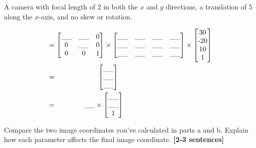 \documentclass{csci1430}
\begin{document}
\pagebreak
\begin{subsubquestion}[points=1]
A camera with focal length of $2$ in both the $x$ and $y$ directions, a translation of $5$ along the $x$-axis, and no skew or rotation.
\end{subsubquestion}

\begin{answer}
\begin{align*}
    &= \begin{bmatrix} 
    \_\_ & \_\_ & $0$    \\  %
    $0$ & \_\_ & $0$     \\  %
    $0$ & $0$ & $1$ 
    \end{bmatrix} 
    \times
    \begin{bmatrix} 
    \_\_ & \_\_ & \_\_ & \_\_  \\ %
    \_\_ & \_\_ & \_\_ & \_\_  \\ %
    \_\_ & \_\_ & \_\_ & \_\_     %
    \end{bmatrix} \times
    \begin{bmatrix} 
    $30$    \\ 
    $-20$   \\ 
    $10$    \\ 
    $1$ \end{bmatrix} \\
    &= \qquad \qquad \qquad \begin{bmatrix} 
    \_\_    \\   %
    \_\_    \\   %
    \_\_         %
    \end{bmatrix} \\
    &= \qquad \quad \quad 
    \_\_         %
    \times 
    \begin{bmatrix}  
    \_\_    \\   %
    \_\_    \\   %
    $1$ 
    \end{bmatrix}
\end{align*}
\end{answer}


\begin{subquestion}[points=2]
Compare the two image coordinates you've calculated in parts a and b. Explain how each parameter affects the final image coordinate. \textbf{[2-3 sentences]}
\end{subquestion}
\end{document}
